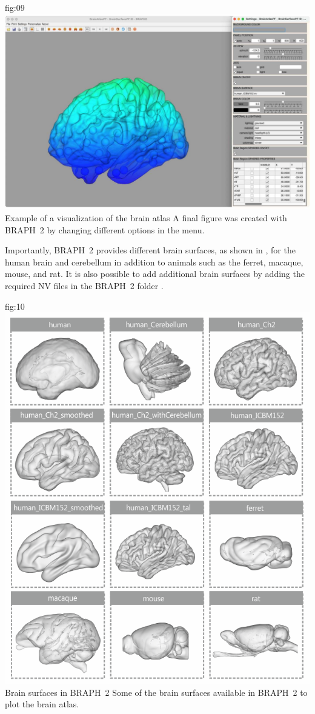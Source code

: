 \documentclass[justified]{tufte-handout}
\begin{document}
	{fig:09}
	{\includegraphics{fig09.jpg}}
	{Example of a visualization of the brain atlas}
	{
	A final figure was created with BRAPH~2 by changing different options in the menu.
	}

\clearpage

Importantly, BRAPH~2 provides different brain surfaces, as shown in , for the human brain and cerebellum in addition to animals such as the ferret, macaque, mouse, and rat.
It is also possible to add additional brain surfaces by adding the required NV files in the BRAPH~2 folder .


	{fig:10}
	{\includegraphics{fig10.png}}
	{Brain surfaces in BRAPH~2}
	{
	Some of the brain surfaces available in BRAPH~2 to plot the brain atlas.
	}
\end{document}

